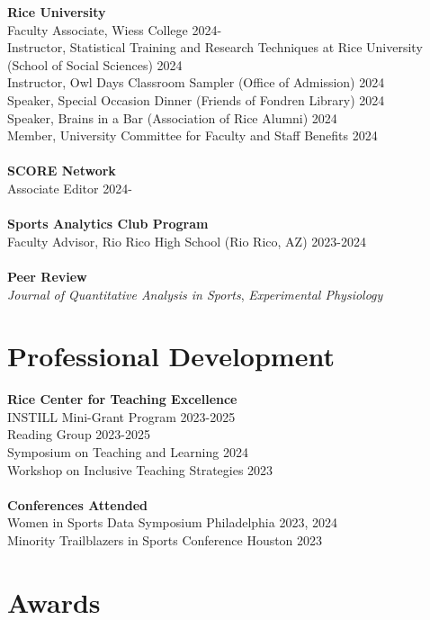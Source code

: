 \documentclass{article}
\begin{document}
{\bf Rice University}\\
Faculty Associate, Wiess College \hfill 2024-\\
Instructor, Statistical Training and Research Techniques at Rice University \hfill (School of Social Sciences) \hfill 2024\\
Instructor, Owl Days Classroom Sampler (Office of Admission) \hfill 2024\\
Speaker, Special Occasion Dinner (Friends of Fondren Library) \hfill 2024\\
Speaker, Brains in a Bar (Association of Rice Alumni) \hfill 2024\\
Member, University Committee for Faculty and Staff Benefits \hfill 2024\\
~\\
{\bf SCORE Network}\\
Associate Editor \hfill 2024-\\
~\\
{\bf Sports Analytics Club Program}\\
Faculty Advisor, Rio Rico High School (Rio Rico, AZ) \hfill 2023-2024\\
~\\
{\bf Peer Review}\\
{\it Journal of Quantitative Analysis in Sports}, {\it Experimental Physiology}

\section*{\sc Professional Development}

{\bf Rice Center for Teaching Excellence}\\
INSTILL Mini-Grant Program \hfill 2023-2025\\
Reading Group \hfill 2023-2025\\
Symposium on Teaching and Learning \hfill 2024\\
Workshop on Inclusive Teaching Strategies \hfill 2023\\
~\\
{\bf Conferences Attended}\\
Women in Sports Data Symposium \hfill Philadelphia 2023, 2024\\
Minority Trailblazers in Sports Conference \hfill Houston 2023

\section*{\sc Awards}
\end{document}
